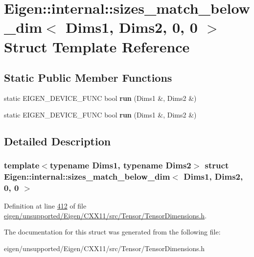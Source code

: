 \hypertarget{struct_eigen_1_1internal_1_1sizes__match__below__dim_3_01_dims1_00_01_dims2_00_010_00_010_01_4}{}\section{Eigen\+:\+:internal\+:\+:sizes\+\_\+match\+\_\+below\+\_\+dim$<$ Dims1, Dims2, 0, 0 $>$ Struct Template Reference}
\label{struct_eigen_1_1internal_1_1sizes__match__below__dim_3_01_dims1_00_01_dims2_00_010_00_010_01_4}
\subsection*{Static Public Member Functions}
\begin{DoxyCompactItemize}
\item 
\mbox{\label{struct_eigen_1_1internal_1_1sizes__match__below__dim_3_01_dims1_00_01_dims2_00_010_00_010_01_4_a23647f26255ee1cc806c72d76484950d}} 
static E\+I\+G\+E\+N\+\_\+\+D\+E\+V\+I\+C\+E\+\_\+\+F\+U\+NC bool {\bfseries run} (Dims1 \&, Dims2 \&)
\item 
\mbox{\label{struct_eigen_1_1internal_1_1sizes__match__below__dim_3_01_dims1_00_01_dims2_00_010_00_010_01_4_a23647f26255ee1cc806c72d76484950d}} 
static E\+I\+G\+E\+N\+\_\+\+D\+E\+V\+I\+C\+E\+\_\+\+F\+U\+NC bool {\bfseries run} (Dims1 \&, Dims2 \&)
\end{DoxyCompactItemize}


\subsection{Detailed Description}
\subsubsection*{template$<$typename Dims1, typename Dims2$>$\newline
struct Eigen\+::internal\+::sizes\+\_\+match\+\_\+below\+\_\+dim$<$ Dims1, Dims2, 0, 0 $>$}



Definition at line \hyperlink{eigen_2unsupported_2_eigen_2_c_x_x11_2src_2_tensor_2_tensor_dimensions_8h_source_l00412}{412} of file \hyperlink{eigen_2unsupported_2_eigen_2_c_x_x11_2src_2_tensor_2_tensor_dimensions_8h_source}{eigen/unsupported/\+Eigen/\+C\+X\+X11/src/\+Tensor/\+Tensor\+Dimensions.\+h}.



The documentation for this struct was generated from the following file\+:\begin{DoxyCompactItemize}
\item 
eigen/unsupported/\+Eigen/\+C\+X\+X11/src/\+Tensor/\+Tensor\+Dimensions.\+h\end{DoxyCompactItemize}
